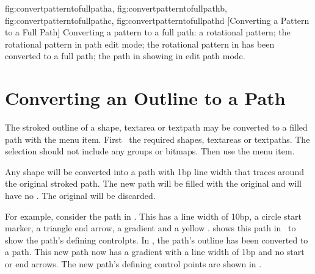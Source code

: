 {
  {fig:convertpatterntofullpatha}{}{},
  {fig:convertpatterntofullpathb}{}{},
  {fig:convertpatterntofullpathc}{}{},
  {fig:convertpatterntofullpathd}{}{}
}
[Converting a Pattern to a Full Path]
{Converting a pattern to a full path:
 a rotational pattern;
 the rotational pattern in
path edit mode; 
 the rotational pattern
in  has been converted to a
full path;
 the path
in  showing in edit 
path mode.}

\section{Converting an Outline to a Path}\label{sec:outlinetopath}


The stroked outline of a \gls{shape}, \gls{textarea} or
\gls{textpath} may be converted to a filled path
with the  menu item.
First \select\ the required \glspl{shape}, \glspl{textarea} or
\glspl{textpath}. The selection should not include any \glspl{group}
or \glspl{bitmap}. Then use the  menu item.

Any \gls{shape} will be converted into a \gls{path} with 1\gls{bp}
line width that traces around the original stroked path. The new
path will be filled with the original  and
will have no . The original
 will be discarded.

For example, consider the path in .
This has a line width of 10\gls{bp}, a circle start marker,
a triangle end arrow, a gradient  and a yellow
.  shows this
path in \editpathmode\ to show the path's defining \glspl{controlpt}. In
, the path's outline
has been converted to a path. This new path now has
a gradient  with a line width of 1\gls{bp} and
no start or end arrows. The new path's defining
control points are shown in .

